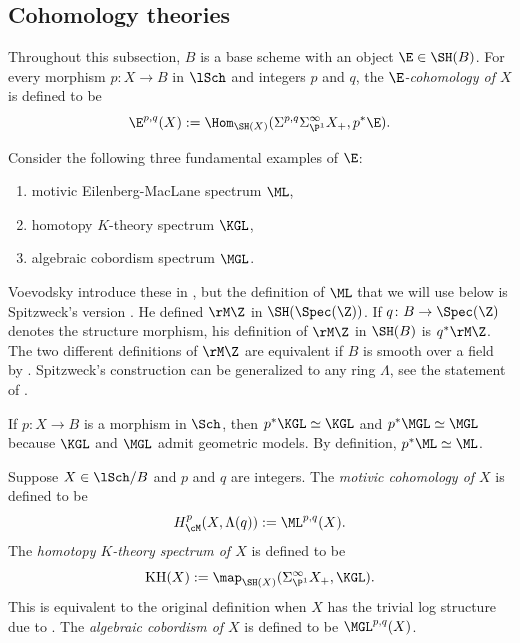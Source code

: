 \documentclass[10pt]{amsart}
\begin{document}
\subsection{Cohomology theories}
\label{cohomology}

Throughout this subsection, $B$ is a base scheme with an object $\E\in \SH(B)$.
For every morphism $p\colon X\to B$ in $\lSch$ and integers $p$ and $q$, the \emph{$\E$-cohomology of $X$} is defined to be
\begin{equation}
\E^{p,q}(X)
:=
\Hom_{\SH(X)}(\Sigma^{p,q}\Sigma_{\P^1}^\infty X_+,p^*\E).
\end{equation}

\begin{exm}
\label{coh.1}
Consider the following three fundamental examples of $\E$:
\begin{enumerate}
\item[(i)] motivic Eilenberg-MacLane spectrum $\ML$,
\item[(ii)] homotopy $K$-theory spectrum $\KGL$,
\item[(iii)] algebraic cobordism spectrum $\MGL$.
\end{enumerate}
Voevodsky introduce these in \cite[Section 6]{zbMATH01194164}, but the definition of $\ML$ that we will use below is Spitzweck's version \cite[Definition 4.27]{zbMATH07015021}.
He defined $\rM\Z$ in $\SH(\Spec(\Z))$.
If $q\colon B\to \Spec(\Z)$ denotes the structure morphism, his definition of $\rM\Z$ in $\SH(B)$ is $q^*\rM\Z$.
The two different definitions of $\rM\Z$ are equivalent if $B$ is smooth over a field by \cite[Theorem 8.22]{zbMATH07015021}.
Spitzweck's construction can be generalized to any ring $\Lambda$, see the statement of \cite[Corollary 10.4]{zbMATH07015021}.

If $p\colon X\to B$ is a morphism in $\Sch$, then $p^*\KGL\simeq \KGL$ and $p^*\MGL\simeq \MGL$ because $\KGL$ and $\MGL$ admit geometric models.
By definition, $p^* \ML \simeq \ML$.
\end{exm}

\begin{df}
\label{coh.2}
Suppose $X\in \lSch/B$ and $p$ and $q$ are integers.
The \emph{motivic cohomology of $X$} is defined to be
\[
H_{\cM}^p(X,\Lambda(q))
:=
\ML^{p,q}(X).
\]
The \emph{homotopy $K$-theory spectrum of $X$} is defined to be
\[
\mathrm{KH}(X)
:=
\map_{\SH(X)}(\Sigma_{\P^1}^\infty X_+,\KGL).
\]
This is equivalent to the original definition when $X$ has the trivial log structure due to \cite{zbMATH06156613}.
The \emph{algebraic cobordism of $X$} is defined to be $\MGL^{p,q}(X)$.
\end{df}
\end{document}

